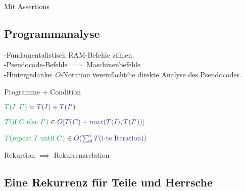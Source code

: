 \documentclass[a4paper]{scrartcl}
\begin{document}
 			\begin{algorithm}
 				\caption{Mit Assertions}
 				\DontPrintSemicolon
 				
 			\end{algorithm}	
 		
 			
 		\subsection{Programmanalyse}
 			-Fundamentalistisch RAM-Befehle zählen. \\
 			-Pseudocode-Befehle \( \implies \) Maschinenbefehle\\
 			-Hintergedanke: \( O \)-Notation vereinfachtdie direkte Analyse des Pseudocodes.
 				\begin{labeling}{Programme + Condition}
 					\item[Zweier Programme]
 						\( \textcolor{Green}{ T ( I, I' ) } = \textcolor{Blue}{ T( I ) + T ( I' ) } \) \reversemarginpar	{}
 					\item[Programme + Condition]
 						\(  \textcolor{Green}{  T (  \text{if }  C  \text{ else } I') } \in \textcolor{Blue}{ O [ T ( C ) + max( T( I ), T ( I' ) ) ] } \)
 					\item[do-for Schleife]
 						\( \textcolor{Green}{ T(  \text{repeat } I \text{ until } C) } \in \textcolor{Blue}{ O ( \sum_0^i T (\text{i-te Iteration} ) ) } \)
 				\end{labeling}
 			Rekursion \( \implies \) Rekurrenzrelation
 		\subsection{Eine Rekurrenz für Teile und Herrsche}
\end{document}
